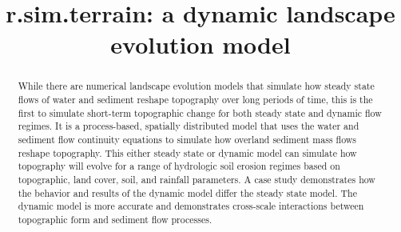 \documentclass[esurf, manuscript]{copernicus}
\begin{document}
\title{\lowercase{r.sim.terrain}: a dynamic landscape evolution model} %








\received{}
\pubdiscuss{} %
\revised{}
\accepted{}
\published{}


\maketitle

\begin{abstract}
While there are numerical landscape evolution models
that simulate how steady state flows of water and sediment
reshape topography over long periods of time, 
this is the first to simulate short-term topographic change 
for both steady state and dynamic flow regimes. 
It is a process-based, spatially distributed model
that uses the water and sediment flow continuity equations
to simulate how overland sediment mass flows 
reshape topography. 
This either steady state or dynamic model can simulate 
how topography will evolve for a range of hydrologic soil erosion regimes
based on topographic, land cover, soil, and rainfall parameters. 
A case study demonstrates how the behavior and results of 
the dynamic model differ the steady state model. 
The dynamic model is more accurate and 
demonstrates cross-scale interactions between 
topographic form and sediment flow processes.
\end{abstract}

\end{document}
